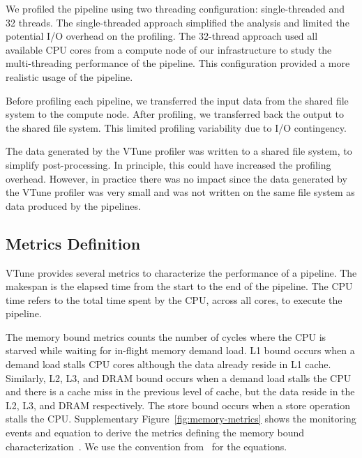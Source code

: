 \documentclass[conference]{IEEEtran}
\begin{document}
\begin{minipage}{\linewidth}
	
\end{minipage}
			
We profiled the pipeline using two threading configuration: single-threaded and 32 threads. The single-threaded approach simplified the analysis and limited the potential I/O overhead on the profiling. 
The 32-thread approach used all available CPU cores from a compute node of our infrastructure to study the multi-threading performance of the pipeline. This configuration provided a more realistic usage of the pipeline.
			
Before profiling each pipeline, we transferred the input data from the shared file system to the compute node. After profiling, we transferred back the output to the shared file system. This limited profiling variability due to I/O contingency.
			
The data generated by the VTune profiler was written to a shared file system, to simplify post-processing. In principle, this could have increased the profiling overhead. However, in practice there was no impact since the data generated by the VTune profiler was very small and was not written on the same file system as data produced by the pipelines.
			 
\subsection{Metrics Definition}
VTune provides several metrics to characterize the performance of a pipeline.  The makespan is the elapsed time from the start to the end of the pipeline. The CPU time refers to the total time spent by the CPU, across all cores, to execute the pipeline. 

The memory bound metrics counts the number of cycles where the CPU is starved while waiting for in-flight memory demand load. L1 bound occurs when a demand load stalls CPU cores although the data already reside in L1 cache. Similarly, L2, L3, and DRAM bound occurs when a demand load stalls the CPU and there is a cache miss in the previous level of cache, but the data reside in the L2, L3, and DRAM respectively. The store bound occurs when a store operation stalls the CPU. Supplementary Figure~\ref{fig:memory-metrics} shows the monitoring events and equation to derive the metrics defining the memory bound characterization~\cite{Intel2006-lc}. We use the convention from~\cite{Kukunas2015-jd} for the equations.
			
\end{document}

